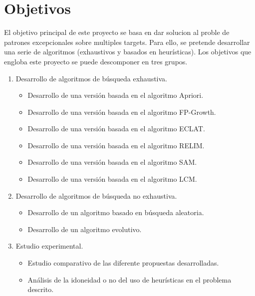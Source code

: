 \documentclass[a4paper, 12pt]{book}
\begin{document}
\section{Objetivos}
El objetivo principal de este proyecto se basa en dar solucion al proble de patrones excepcionales sobre multiples targets. Para ello, se pretende desarrollar una serie de algoritmos (exhaustivos y basados en heurísticas). Los objetivos que engloba este proyecto se puede descomponer en tres grupos.
\begin{enumerate}
    \item Desarrollo de algoritmos de búsqueda exhaustiva.
    \begin{itemize}
        \item Desarrollo de una versión basada en el algoritmo Apriori.
        \item Desarrollo de una versión basada en el algoritmo FP-Growth.
        \item Desarrollo de una versión basada en el algoritmo ECLAT.
        \item Desarrollo de una versión basada en el algoritmo RELIM.
        \item Desarrollo de una versión basada en el algoritmo SAM.
        \item Desarrollo de una versión basada en el algoritmo LCM.
    \end{itemize}
    \item Desarrollo de algoritmos de búsqueda no exhaustiva.
        \begin{itemize}
            \item Desarrollo de un algoritmo basado en búsqueda aleatoria.
            \item Desarrollo de un algoritmo evolutivo.
        \end{itemize}
    \item Estudio experimental.
        \begin{itemize}
            \item Estudio comparativo de las diferente propuestas desarrolladas.
            \item Análisis de la idoneidad o no del uso de heurísticas en el problema descrito.
        \end{itemize}
    
\end{enumerate}
\newpage
\end{document}
